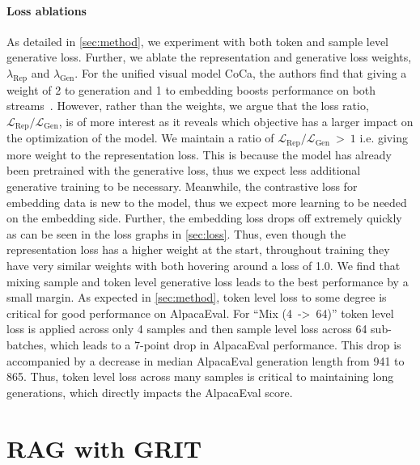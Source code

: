 \documentclass{article}
\newcommand{\method}{\textsc{GRIT}}
\begin{document}
\paragraph{Loss ablations} As detailed in \autoref{sec:method}, we experiment with both token and sample level generative loss. Further, we ablate the representation and generative loss weights, $\lambda_{\text{Rep}}$ and $\lambda_{\text{Gen}}$. For the unified visual model CoCa, the authors find that giving a weight of 2 to generation and 1 to embedding boosts performance on both streams~\cite{yu2022coca}. However, rather than the weights, we argue that the loss ratio, $\mathcal{L}_{\text{Rep}}/\mathcal{L}_{\text{Gen}}$, is of more interest as it reveals which objective has a larger impact on the optimization of the model. We maintain a ratio of $\mathcal{L}_{\text{Rep}}/\mathcal{L}_{\text{Gen}}~>~1$ i.e. giving more weight to the representation loss. This is because the model has already been pretrained with the generative loss, thus we expect less additional generative training to be necessary. Meanwhile, the contrastive loss for embedding data is new to the model, thus we expect more learning to be needed on the embedding side. Further, the embedding loss drops off extremely quickly as can be seen in the loss graphs in \autoref{sec:loss}. Thus, even though the representation loss has a higher weight at the start, throughout training they have very similar weights with both hovering around a loss of 1.0. We find that mixing sample and token level generative loss leads to the best performance by a small margin. As expected in \autoref{sec:method}, token level loss to some degree is critical for good performance on AlpacaEval. For ``Mix (4~->~64)''  token level loss is applied across only 4 samples and then sample level loss across 64 sub-batches, which leads to a 7-point drop in AlpacaEval performance. This drop is accompanied by a decrease in median AlpacaEval generation length from 941 to 865. Thus, token level loss across many samples is critical to maintaining long generations, which directly impacts the AlpacaEval score.

\FloatBarrier

\section{RAG with \method{}}
\label{sec:rag}
\end{document}
